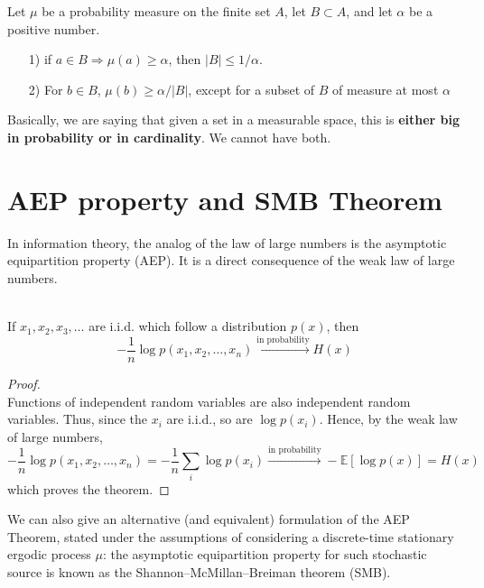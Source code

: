 \begin{lemma}
    Let $\mu$ be a probability measure on the finite set $A$, let $B \subset A$, and let $\alpha$ be a positive number.
    \begin{itemize}
        \item[1)] if $a \in B \Rightarrow \mu(a) \geq \alpha$, then $|B| \leq 1/\alpha$.
        \item[2)] For $b \in B$, $\mu(b) \geq \alpha/|B|$, except for a subset of $B$ of measure at most $\alpha$
    \end{itemize}
\end{lemma}
Basically, we are saying that given a set in a measurable space, this is \textbf{either big in probability or in cardinality}. We cannot have both. 

\section{AEP property and SMB Theorem}
In information theory, the analog of the law of large numbers is the asymptotic equipartition property (AEP). It is a direct consequence of the weak law of large numbers.
\begin{theorem}
    \hfill \\
    If $x_1, x_2, x_3, \dots$ are i.i.d. which follow a distribution $p(x)$, then 
    \begin{equation}
        -\frac{1}{n} \log p(x_1, x_2, \dots, x_n) \xrightarrow{\text{in probability}}  H(x)
    \end{equation}
\end{theorem}
\begin{proof}
\hfill
\\
    Functions of independent random variables are also independent random variables. Thus, since the $x_i$ are i.i.d., so are $\log p(x_i)$. Hence, by the weak law of large numbers, 
    \begin{equation*}
        -\frac{1}{n} \log p(x_1, x_2, \dots, x_n) = -\frac{1}{n} \sum_i \log p(x_i) \xrightarrow{\text{in probability}} - \mathbb{E}[\log p(x)] = H(x)
    \end{equation*}
    which proves the theorem.
\end{proof}
We can also give an alternative (and equivalent) formulation of the AEP Theorem, stated under the assumptions of considering a  discrete-time stationary ergodic process $\mu$: the asymptotic equipartition property for such stochastic source is known as the Shannon–McMillan–Breiman theorem (SMB).

